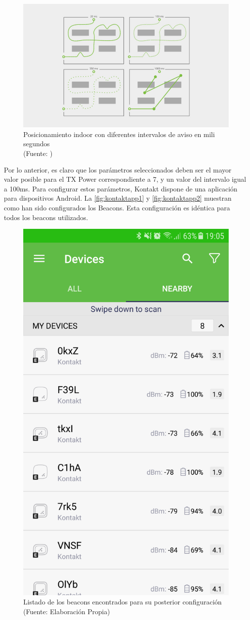 \begin{figure}[ht!]
\centering
\includegraphics[width=.6\textwidth]{figures/interval.jpg}
\caption[abs]{Posicionamiento indoor con diferentes intervalos de aviso en mili segundos\\
{\scriptsize (Fuente: \cite{interval})}}
\label{fig:intervalo}
\end{figure}

Por lo anterior, es claro que los parámetros seleccionados deben ser el mayor valor posible para el TX Power correspondiente a 7, y un valor del intervalo igual a 100ms. Para configurar estos parámetros, Kontakt dispone de una aplicación para dispositivos Android. La \autoref{fig:kontaktapp1} y \ref{fig:kontaktapp2} muestran como han sido configurados los Beacons. Esta configuración es idéntica para todos los beacons utilizados.


\begin{figure}[ht!]
\centering
\includegraphics[width=.3\textwidth]{figures/kontaktapp1.png}
\caption[abs]{Listado de los beacons encontrados para su posterior configuración\\
{\scriptsize (Fuente: Elaboración Propia)}}
\label{fig:kontaktapp1}
\end{figure}

